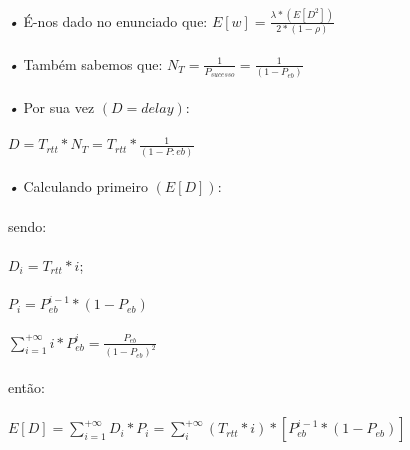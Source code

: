 \documentclass[13pt,a4paper]{report}
\begin{document}
\paragraph{}
\emph{•} É-nos dado no enunciado que:
$E[w] = \frac{\lambda * (E[D^2])}{2 * (1 - \rho)}$

\paragraph{}
\emph{•} Também sabemos que: 
$N_{T} = \frac{1}{P_{sucesso}} = \frac{1}{(1-P_{eb})}$

\paragraph{}
\emph{•} Por sua vez $(D = delay)$: 
\paragraph{}
$D = T_{rtt} * N_{T} = T_{rtt} * \frac{1}{(1-P:{eb})}$ 	

\paragraph{}
\emph{•} Calculando primeiro $(E[D])$:

\paragraph{}
sendo:
\paragraph{} 
$D_{i} = T_{rtt} * i$; 
\paragraph{}
$P_{i} = P_{eb}^{i-1} * (1-P_{eb})$ 
\paragraph{}
$\sum\limits_{i=1}^{+\infty} i * P_{eb}^i = \frac{P_{eb}}{(1-P_{eb})^2}$

\paragraph{}
\paragraph{}
então:
\paragraph{}
$E[D] = \sum\limits_{i=1}^{+\infty} D_{i} * P_{i} = \sum\limits_{i}^{+\infty} (T_{rtt} * i) * [ P_{eb}^{i-1} * (1 - P_{eb})]$
\end{document}
